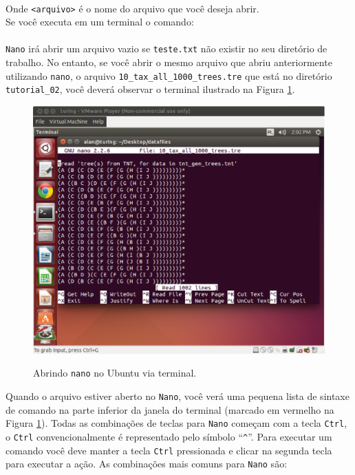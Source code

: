 \begin{refsection}
\\

Onde \texttt{<arquivo>} é o nome do arquivo que você deseja abrir.\\
Se você executa em um terminal o comando:\\

\\

\texttt{Nano} irá abrir um arquivo vazio se \texttt{teste.txt} não existir no seu diretório de trabalho. No entanto, se você abrir o mesmo arquivo que abriu anteriormente utilizando \texttt{nano}, o arquivo \texttt{10\_tax\_all\_1000\_trees.tre} que está no diretório \texttt{tutorial\_02}, você deverá observar o terminal ilustrado na Figura \ref{tut2:fig:nano}.\\

  \begin{figure}[H]
      {\includegraphics[scale=0.35]{figures/tut2/nano.eps}}
      {\caption[\textit{Abrindo \texttt{nano} }]{Abrindo \texttt{nano} no Ubuntu via terminal.}\label{tut2:fig:nano}}
  \end{figure}


Quando o arquivo estiver aberto no \texttt{Nano}, você verá uma pequena lista de sintaxe de comando na parte inferior da janela do terminal (marcado em vermelho na Figura \ref{tut2:fig:nano}). Todas as combinações de teclas para \texttt{Nano} começam com a tecla \texttt{Ctrl}, o \texttt{Ctrl} convencionalmente é representado pelo símbolo ``\texttt{\^{}}''. Para executar um comando você deve manter a tecla \texttt{Ctrl} pressionada e clicar na segunda tecla para executar a ação. As combinações mais comuns para \texttt{Nano} são:\\


\end{refsection}
